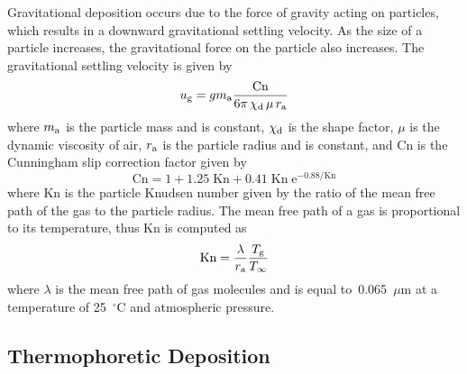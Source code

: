 Gravitational deposition occurs due to the force of gravity acting on particles, which results in a downward gravitational settling velocity. As the size of a particle increases, the gravitational force on the particle also increases. The gravitational settling velocity is given by~\cite{Davies_Charles}
\begin{equation}
u\sb{g} = g m\sb{a} \frac{\textrm{Cn}}{6 \pi \, \chi\sb{d} \, \mu \, r\sb{a}}
\end{equation}
where $m\sb{a}$ is the particle mass and is constant, $\chi\sb{d}$ is the shape factor, $\mu$ is the dynamic viscosity of air, $r\sb{a}$ is the particle radius and is constant, and Cn is the Cunningham slip correction factor given by~\cite{Cunningham:1}
\begin{equation}
\textrm{Cn} = 1 + 1.25 \; \textrm{Kn} + 0.41 \; \textrm{Kn} \; \mathrm{e}^{-0.88/\textrm{Kn}}
\label{eq:Cn}
\end{equation}
where Kn is the particle Knudsen number given by the ratio of the mean free path of the gas to the particle radius. The mean free path of a gas is proportional to its temperature, thus Kn is computed as~\cite{Sippola:1}
\begin{equation}
\textrm{Kn} = \frac{\lambda}{r\sb{a}} \frac{T\sb{g}}{T_\infty}
\end{equation}
where $\lambda$ is the mean free path of gas molecules and is equal to~0.065~$\mu$m at a temperature of 25~$^\circ$C and atmospheric pressure.

\subsection{Thermophoretic Deposition}
\label{sec:thermophoretic_deposition}

